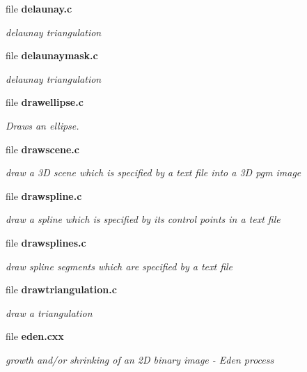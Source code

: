 \begin{CompactItemize}
\item 
file {\bf delaunay.c}
\begin{CompactList}\small\item\em delaunay triangulation \item\end{CompactList}

\item 
file {\bf delaunaymask.c}
\begin{CompactList}\small\item\em delaunay triangulation \item\end{CompactList}

\item 
file {\bf drawellipse.c}
\begin{CompactList}\small\item\em Draws an ellipse. \item\end{CompactList}

\item 
file {\bf drawscene.c}
\begin{CompactList}\small\item\em draw a 3D scene which is specified by a text file into a 3D pgm image \item\end{CompactList}

\item 
file {\bf drawspline.c}
\begin{CompactList}\small\item\em draw a spline which is specified by its control points in a text file \item\end{CompactList}

\item 
file {\bf drawsplines.c}
\begin{CompactList}\small\item\em draw spline segments which are specified by a text file \item\end{CompactList}

\item 
file {\bf drawtriangulation.c}
\begin{CompactList}\small\item\em draw a triangulation \item\end{CompactList}

\item 
file {\bf eden.cxx}
\begin{CompactList}\small\item\em growth and/or shrinking of an 2D binary image - Eden process \item\end{CompactList}


\end{CompactItemize}
